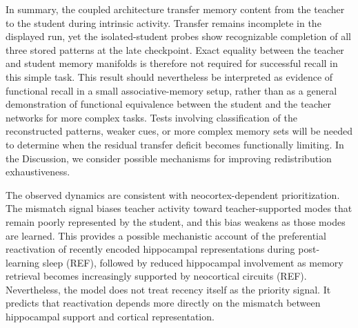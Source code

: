 \documentclass[10pt,letterpaper]{article}
\theoremstyle{plain}
\theoremstyle{remark}
\begin{document}
In summary, the coupled architecture transfer memory content from the teacher to the student during intrinsic activity. Transfer remains incomplete in the displayed run, yet the isolated-student probes show recognizable completion of all three stored patterns at the late checkpoint. Exact equality between the teacher and student memory manifolds is therefore not required for successful recall in this simple task. This result should nevertheless be interpreted as evidence of functional recall in a small associative-memory setup, rather than as a general demonstration of functional equivalence between the student and the teacher networks for more complex tasks. Tests involving classification of the reconstructed patterns, weaker cues, or more complex memory sets will be needed to determine when the residual transfer deficit becomes functionally limiting. In the Discussion, we consider possible mechanisms for improving redistribution exhaustiveness.

The observed dynamics are consistent with neocortex-dependent prioritization. The mismatch signal biases teacher activity toward teacher-supported modes that remain poorly represented by the student, and this bias weakens as those modes are learned. This provides a possible mechanistic account of the preferential reactivation of recently encoded hippocampal representations during post-learning sleep (REF), followed by reduced hippocampal involvement as memory retrieval becomes increasingly supported by neocortical circuits (REF). Nevertheless, the model does not treat recency itself as the priority signal. It predicts that reactivation depends more directly on the mismatch between hippocampal support and cortical representation.
\end{document}
